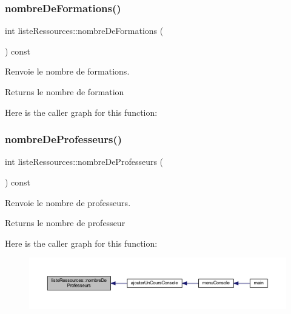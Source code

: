 \subsubsection{\texorpdfstring{nombre\+De\+Formations()}{nombreDeFormations()}}
{\footnotesize\ttfamily int liste\+Ressources\+::nombre\+De\+Formations (\begin{DoxyParamCaption}{ }\end{DoxyParamCaption}) const}



Renvoie le nombre de formations. 

\begin{DoxyReturn}{Returns}
le nombre de formation 
\end{DoxyReturn}
Here is the caller graph for this function\+:
\hypertarget{classliste_ressources_a9b496a36a9651347734d7895397dde00}{}\label{classliste_ressources_a9b496a36a9651347734d7895397dde00} 
\subsubsection{\texorpdfstring{nombre\+De\+Professeurs()}{nombreDeProfesseurs()}}
{\footnotesize\ttfamily int liste\+Ressources\+::nombre\+De\+Professeurs (\begin{DoxyParamCaption}{ }\end{DoxyParamCaption}) const}



Renvoie le nombre de professeurs. 

\begin{DoxyReturn}{Returns}
le nombre de professeur 
\end{DoxyReturn}
Here is the caller graph for this function\+:\nopagebreak
\begin{figure}[H]
\begin{center}
\leavevmode
\includegraphics[width=350pt]{classliste_ressources_a9b496a36a9651347734d7895397dde00_icgraph}
\end{center}
\end{figure}
\hypertarget{classliste_ressources_a1a7f82a289bda61cf08485e92dd32b2e}{}\label{classliste_ressources_a1a7f82a289bda61cf08485e92dd32b2e} 

